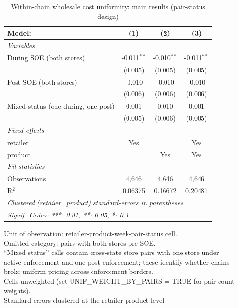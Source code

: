 
\begin{table}[htbp]
   \caption{\label{tab:uniformity_wholesale_main} Within-chain wholesale cost uniformity: main results (pair-status design)}
   \centering
   \begin{tabular}{lccc}
      \tabularnewline \midrule \midrule
      Model:                              & (1)           & (2)           & (3)\\  
      \midrule
      \emph{Variables}\\
      During SOE (both stores)            & -0.011$^{**}$ & -0.010$^{**}$ & -0.011$^{**}$\\   
                                          & (0.005)       & (0.005)       & (0.005)\\   
      Post-SOE (both stores)              & -0.010        & -0.010        & -0.010\\   
                                          & (0.006)       & (0.006)       & (0.006)\\   
      Mixed status (one during, one post) & 0.001         & 0.010         & 0.001\\   
                                          & (0.005)       & (0.006)       & (0.005)\\   
      \midrule
      \emph{Fixed-effects}\\
      retailer                            & Yes           &               & Yes\\  
      product                             &               & Yes           & Yes\\  
      \midrule
      \emph{Fit statistics}\\
      Observations                        & 4,646         & 4,646         & 4,646\\  
      R$^2$                               & 0.06375       & 0.16672       & 0.20481\\  
      \midrule \midrule
      \multicolumn{4}{l}{\emph{Clustered (retailer\_product) standard-errors in parentheses}}\\
      \multicolumn{4}{l}{\emph{Signif. Codes: ***: 0.01, **: 0.05, *: 0.1}}\\
   \end{tabular}
   
   \par \raggedright 
   Unit of observation: retailer-product-week-pair-status cell.\\
   Omitted category: pairs with both stores pre-SOE.\\
   ``Mixed status'' cells contain cross-state store pairs with one store under\\
   active enforcement and one post-enforcement; these identify whether chains\\
   broke uniform pricing across enforcement borders.\\
   Cells unweighted (set UNIF\_WEIGHT\_BY\_PAIRS = TRUE for pair-count weights).\\
   Standard errors clustered at the retailer-product level.
\end{table}


